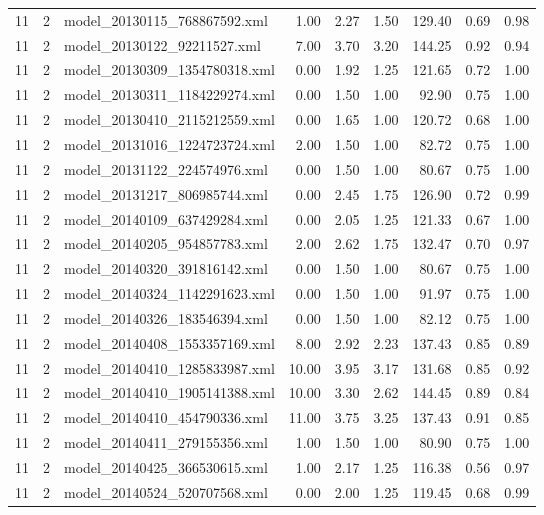 \begin{table}[ht]
\begin{tabular}{rrlrrrrrr}
   11 &   2 & model\_20130115\_768867592.xml & 1.00 & 2.27 & 1.50 & 129.40 & 0.69 & 0.98 \\ 
   11 &   2 & model\_20130122\_92211527.xml & 7.00 & 3.70 & 3.20 & 144.25 & 0.92 & 0.94 \\ 
   11 &   2 & model\_20130309\_1354780318.xml & 0.00 & 1.92 & 1.25 & 121.65 & 0.72 & 1.00 \\ 
   11 &   2 & model\_20130311\_1184229274.xml & 0.00 & 1.50 & 1.00 & 92.90 & 0.75 & 1.00 \\ 
   11 &   2 & model\_20130410\_2115212559.xml & 0.00 & 1.65 & 1.00 & 120.72 & 0.68 & 1.00 \\ 
   11 &   2 & model\_20131016\_1224723724.xml & 2.00 & 1.50 & 1.00 & 82.72 & 0.75 & 1.00 \\ 
   11 &   2 & model\_20131122\_224574976.xml & 0.00 & 1.50 & 1.00 & 80.67 & 0.75 & 1.00 \\ 
   11 &   2 & model\_20131217\_806985744.xml & 0.00 & 2.45 & 1.75 & 126.90 & 0.72 & 0.99 \\ 
   11 &   2 & model\_20140109\_637429284.xml & 0.00 & 2.05 & 1.25 & 121.33 & 0.67 & 1.00 \\ 
   11 &   2 & model\_20140205\_954857783.xml & 2.00 & 2.62 & 1.75 & 132.47 & 0.70 & 0.97 \\ 
   11 &   2 & model\_20140320\_391816142.xml & 0.00 & 1.50 & 1.00 & 80.67 & 0.75 & 1.00 \\ 
   11 &   2 & model\_20140324\_1142291623.xml & 0.00 & 1.50 & 1.00 & 91.97 & 0.75 & 1.00 \\ 
   11 &   2 & model\_20140326\_183546394.xml & 0.00 & 1.50 & 1.00 & 82.12 & 0.75 & 1.00 \\ 
   11 &   2 & model\_20140408\_1553357169.xml & 8.00 & 2.92 & 2.23 & 137.43 & 0.85 & 0.89 \\ 
   11 &   2 & model\_20140410\_1285833987.xml & 10.00 & 3.95 & 3.17 & 131.68 & 0.85 & 0.92 \\ 
   11 &   2 & model\_20140410\_1905141388.xml & 10.00 & 3.30 & 2.62 & 144.45 & 0.89 & 0.84 \\ 
   11 &   2 & model\_20140410\_454790336.xml & 11.00 & 3.75 & 3.25 & 137.43 & 0.91 & 0.85 \\ 
   11 &   2 & model\_20140411\_279155356.xml & 1.00 & 1.50 & 1.00 & 80.90 & 0.75 & 1.00 \\ 
   11 &   2 & model\_20140425\_366530615.xml & 1.00 & 2.17 & 1.25 & 116.38 & 0.56 & 0.97 \\ 
   11 &   2 & model\_20140524\_520707568.xml & 0.00 & 2.00 & 1.25 & 119.45 & 0.68 & 0.99 \\ 

\end{tabular}
\end{table}
